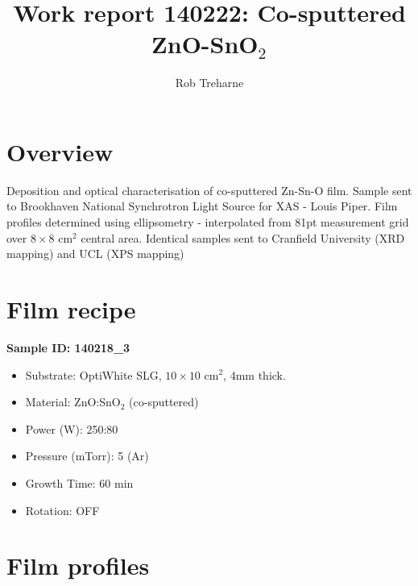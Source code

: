 \documentclass{article}
\title{Work report 140222: Co-sputtered ZnO-SnO$_2$}
\author{Rob Treharne}
\begin{document}
\maketitle

\section{Overview}

Deposition and optical characterisation of co-sputtered Zn-Sn-O film. Sample sent to Brookhaven National Synchrotron Light Source for XAS - Louis Piper. Film profiles determined using ellipsometry - interpolated from 81pt measurement grid over $8\times8$ cm$^2$ central area. Identical samples sent to Cranfield University (XRD mapping) and UCL (XPS mapping)

\section{Film recipe}
\textbf{Sample ID: 140218\_3}



\begin{itemize}
  \item{Substrate: OptiWhite SLG, $10\times10$ cm$^2$, 4mm thick.}
  \item{Material: ZnO:SnO$_2$ (co-sputtered)}
  \item{Power (W): 250:80}
  \item{Pressure (mTorr): 5 (Ar)}
  \item{Growth Time: 60 min}
  \item{Rotation: OFF}
\end{itemize}

\section{Film profiles}
\end{document}
